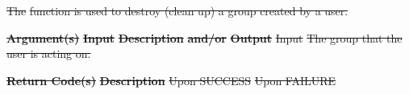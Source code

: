 \documentclass[12pt]{report} %
\providecommand{\DIFdeltex}[1]{{\protect\color{red}\sout{#1}}}                      %
\providecommand{\DIFdelbegin}{} %
\providecommand{\DIFdel}[1]{\texorpdfstring{\DIFdeltex{#1}}{}} %
\newcommand{\DIFscaledelfig}{0.5}
\newlength{\DIFdelgraphicswidth} %
\newlength{\DIFdelgraphicsheight} %
\newcommand{\DIFdelincludegraphics}[2][]{%
\sbox{\DIFdelgraphicsbox}{\DIFOincludegraphics[#1]{#2}}%
\settoboxwidth{\DIFdelgraphicswidth}{\DIFdelgraphicsbox} %
\settoboxtotalheight{\DIFdelgraphicsheight}{\DIFdelgraphicsbox} %
\scalebox{\DIFscaledelfig}{%
\parbox[b]{\DIFdelgraphicswidth}{\usebox{\DIFdelgraphicsbox}\\[-\baselineskip] \rule{\DIFdelgraphicswidth}{0em}}\llap{\resizebox{\DIFdelgraphicswidth}{\DIFdelgraphicsheight}{%
\setlength{\unitlength}{\DIFdelgraphicswidth}%
\begin{picture}(1,1)%
\thicklines\linethickness{2pt} %
{\color[rgb]{1,0,0}\put(0,0){\framebox(1,1){}}}%
{\color[rgb]{1,0,0}\put(0,0){\line( 1,1){1}}}%
{\color[rgb]{1,0,0}\put(0,1){\line(1,-1){1}}}%
\end{picture}%
}\hspace*{3pt}}} %
} %
\DeclareRobustCommand{\DIFdelbegin}{\DIFOdelbegin \let\includegraphics\DIFdelincludegraphics} %
\begin{document}
\DIFdelbegin %


\DIFdel{The }%
\DIFdel{function is used to destroy (clean up) a group created by a user.
}%


\textbf{\DIFdel{Argument(s)}} %
\textbf{\DIFdel{Input }}  %
\textbf{\DIFdel{Description}} %
\textbf{\DIFdel{and/or}}     %
\textbf{\DIFdel{Output}} %
\DIFdel{Input  }%
\DIFdel{The group that the user is acting on.   }%

\textbf{\DIFdel{Return Code(s)}} %
\textbf{\DIFdel{Description}} %
\DIFdel{Upon SUCCESS}%
\DIFdel{Upon FAILURE}%
\end{document}
